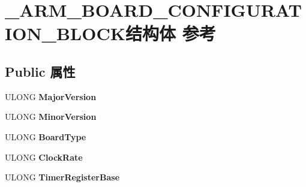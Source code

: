 \hypertarget{struct___a_r_m___b_o_a_r_d___c_o_n_f_i_g_u_r_a_t_i_o_n___b_l_o_c_k}{}\section{\+\_\+\+A\+R\+M\+\_\+\+B\+O\+A\+R\+D\+\_\+\+C\+O\+N\+F\+I\+G\+U\+R\+A\+T\+I\+O\+N\+\_\+\+B\+L\+O\+C\+K结构体 参考}
\label{struct___a_r_m___b_o_a_r_d___c_o_n_f_i_g_u_r_a_t_i_o_n___b_l_o_c_k}
\subsection*{Public 属性}
\begin{DoxyCompactItemize}
\item 
\mbox{\label{struct___a_r_m___b_o_a_r_d___c_o_n_f_i_g_u_r_a_t_i_o_n___b_l_o_c_k_a4642864f553a1c607612659b73150249}} 
U\+L\+O\+NG {\bfseries Major\+Version}
\item 
\mbox{\label{struct___a_r_m___b_o_a_r_d___c_o_n_f_i_g_u_r_a_t_i_o_n___b_l_o_c_k_a422567f858bbdde2e9061b6d5438d508}} 
U\+L\+O\+NG {\bfseries Minor\+Version}
\item 
\mbox{\label{struct___a_r_m___b_o_a_r_d___c_o_n_f_i_g_u_r_a_t_i_o_n___b_l_o_c_k_aeb09685eb4f9cd681a137edddd7d4f1f}} 
U\+L\+O\+NG {\bfseries Board\+Type}
\item 
\mbox{\label{struct___a_r_m___b_o_a_r_d___c_o_n_f_i_g_u_r_a_t_i_o_n___b_l_o_c_k_adae5905988b1292eda2d9accb994a378}} 
U\+L\+O\+NG {\bfseries Clock\+Rate}
\item 
\mbox{\label{struct___a_r_m___b_o_a_r_d___c_o_n_f_i_g_u_r_a_t_i_o_n___b_l_o_c_k_a55262a02f2c00487c64692a58b53865d}} 
U\+L\+O\+NG {\bfseries Timer\+Register\+Base}
\item 
\mbox{\label{struct___a_r_m___b_o_a_r_d___c_o_n_f_i_g_u_r_a_t_i_o_n___b_l_o_c_k_a4d4a12ca3ebdbca1bd9abf99907434b6}} 

\end{DoxyCompactItemize}
